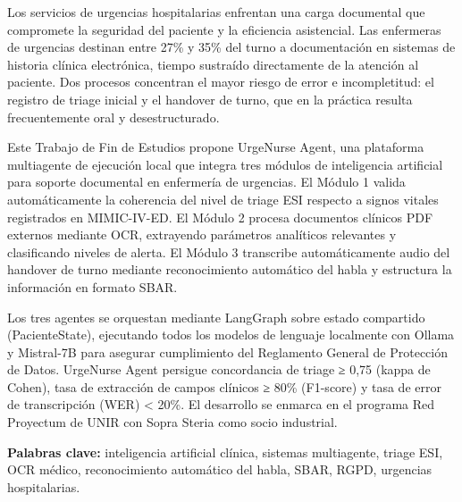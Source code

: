 
Los servicios de urgencias hospitalarias enfrentan una carga documental que compromete la seguridad del paciente y la eficiencia asistencial. Las enfermeras de urgencias destinan entre 27\% y 35\% del turno a documentación en sistemas de historia clínica electrónica, tiempo sustraído directamente de la atención al paciente. Dos procesos concentran el mayor riesgo de error e incompletitud: el registro de triage inicial y el handover de turno, que en la práctica resulta frecuentemente oral y desestructurado.

Este Trabajo de Fin de Estudios propone UrgeNurse Agent, una plataforma multiagente de ejecución local que integra tres módulos de inteligencia artificial para soporte documental en enfermería de urgencias. El Módulo 1 valida automáticamente la coherencia del nivel de triage ESI respecto a signos vitales registrados en MIMIC-IV-ED. El Módulo 2 procesa documentos clínicos PDF externos mediante OCR, extrayendo parámetros analíticos relevantes y clasificando niveles de alerta. El Módulo 3 transcribe automáticamente audio del handover de turno mediante reconocimiento automático del habla y estructura la información en formato SBAR.

Los tres agentes se orquestan mediante LangGraph sobre estado compartido (PacienteState), ejecutando todos los modelos de lenguaje localmente con Ollama y Mistral-7B para asegurar cumplimiento del Reglamento General de Protección de Datos. UrgeNurse Agent persigue concordancia de triage ≥ 0,75 (kappa de Cohen), tasa de extracción de campos clínicos ≥ 80\% (F1-score) y tasa de error de transcripción (WER) < 20\%. El desarrollo se enmarca en el programa Red Proyectum de UNIR con Sopra Steria como socio industrial.

\vspace{2em}

\textbf{Palabras clave:} inteligencia artificial clínica, sistemas multiagente, triage ESI, OCR médico, reconocimiento automático del habla, SBAR, RGPD, urgencias hospitalarias.

